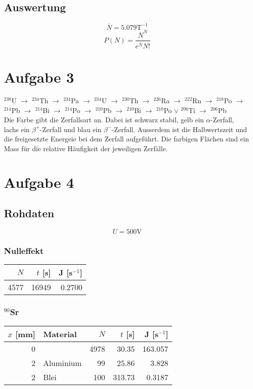 \documentclass[12pt,a4paper]{article}
\begin{document}
\subsection*{Auswertung}
\[ \overline{N} = 5.079 \mbox{T}^{-1} \]
\[ P(N) = \frac{\overline{N}^N}{e^{\overline{N}}N!} \]

\section*{Aufgabe 3}
$^{238}$U $\rightarrow$  $^{234}$Th $\rightarrow$  $^{234}$Pa $\rightarrow$  $^{234}$U $\rightarrow$  $^{230}$Th $\rightarrow$  $^{226}$Ra $\rightarrow$  $^{222}$Rn $\rightarrow$  $^{218}$Po $\rightarrow$  $^{214}$Pb $\rightarrow$  $^{214}$Bi $\rightarrow$  $^{214}$Po $\rightarrow$  $^{210}$Pb $\rightarrow$  $^{210}$Bi $\rightarrow$  $^{210}$Po $\lor$  $^{206}$Ti $\rightarrow$  $^{206}$Pb  \\
Die Farbe gibt die Zerfallsart an. Dabei ist schwarz stabil, gelb ein $\alpha$-Zerfall, lachs ein $\beta^+$-Zerfall und blau ein $\beta^-$-Zerfall. Ausserdem ist die Halbwertszeit und die freigesetzte Energeie bei dem Zerfall aufgef\"uhrt. Die farbigen Fl\"achen sind ein Mass f\"ur die relative H\"aufigkeit der jeweiligen Zerf\"alle.


\section*{Aufgabe 4}
\subsection*{Rohdaten}
\[ U = 500\mbox{V} \]
\subsubsection*{Nulleffekt}
\begin{tabular}{|r|r|r|}
\hline
$N$&$t$ [s]&J [s$^{-1}$]\\
\hline
4577&16949&0.2700\\
\hline
\end{tabular}

\subsubsection*{${}^{90}$Sr}
\begin{tabular}{|r|l|r|r|r|}
\hline
$x$ [mm]&Material&$N$&$t$ [s]&J [s$^{-1}$]\\
\hline
0&&4978&30.35&163.057\\
2&Aluminium&99&25.86&3.828\\
2&Blei&100&313.73&0.3187\\
\hline
\end{tabular}
\end{document}
